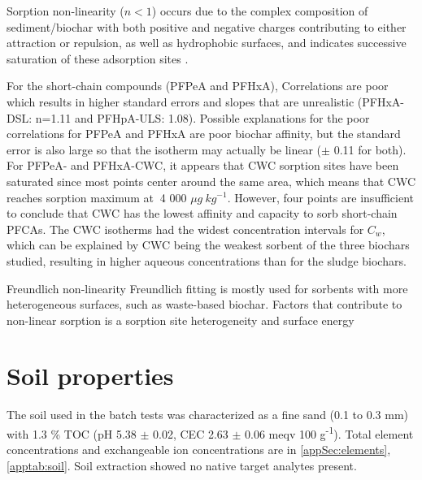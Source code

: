 Sorption non-linearity ($n<1$) occurs due to the complex composition of sediment/biochar with both positive and negative charges contributing to either attraction or repulsion, as well as hydrophobic surfaces, and indicates successive saturation of these adsorption sites \citep{yin2022insights}.  

For the short-chain compounds (PFPeA and PFHxA), Correlations are poor which results in higher standard errors and slopes that are unrealistic (PFHxA-DSL: n=1.11 and PFHpA-ULS: 1.08). Possible explanations for the poor correlations for PFPeA and PFHxA are poor biochar affinity, but the standard error is also large so that the isotherm may actually be linear ($\pm$ 0.11 for both). For PFPeA- and PFHxA-CWC, it appears that CWC sorption sites have been saturated since most points center around the same area, which means that CWC reaches sorption maximum at $~$4 000 $\mu g~kg^{-1}$. However, four points are insufficient to conclude that CWC has the lowest affinity and capacity to sorb short-chain PFCAs. The CWC isotherms had the widest concentration intervals for $C_w$, which can be explained by CWC being the weakest sorbent of the three biochars studied, resulting in higher aqueous concentrations than for the sludge biochars. 

Freundlich non-linearity \citep{yu2009sorption}
Freundlich fitting is mostly used for sorbents with more heterogeneous surfaces, such as waste-based biochar. Factors that contribute to non-linear sorption is a sorption site heterogeneity and surface energy 


\section{Soil properties}\label{sec:Soil}
The soil used in the batch tests was characterized as a fine sand (0.1 to 0.3 mm) with 1.3 \% TOC (pH 5.38 $\pm$ 0.02, CEC 2.63 $\pm$ 0.06 meqv 100 g\textsuperscript{-1}). Total element concentrations and exchangeable ion concentrations are in \cref{appSec:elements}, \cref{apptab:soil}. Soil extraction showed no native target analytes present. 


